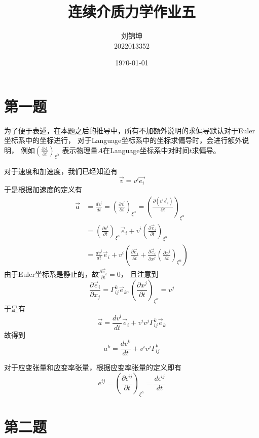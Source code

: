 \documentclass[UTF8]{ctexart}
\title{连续介质力学作业五}
\author{刘锦坤\\2022013352}
\date{\today}
\begin{document}
\maketitle

\section{第一题}

为了便于表述，在本题之后的推导中，所有不加额外说明的求偏导默认对于Euler坐标系中的坐标进行，
对于Language坐标系中的坐标求偏导时，会进行额外说明，
例如$(\frac{\partial A}{\partial t})_{\xi^\alpha}$
表示物理量$A$在Language坐标系中对时间$t$求偏导。

对于速度和加速度，我们已经知道有
$$
\vec v = v^i\vec{e_i}
$$
\noindent 于是根据加速度的定义有
\begin{align*}
\vec a &= \frac{d\vec v}{dt} = (\frac{\partial \vec v}{\partial t})_{\xi^\alpha}
=(\frac {\partial (v^i \vec e_i)}{\partial t})_{\xi^\alpha}\\
&=(\frac{\partial v^i}{\partial t})_{\xi^\alpha} \vec e_i+
v^i (\frac{\partial \vec e_i}{\partial t})_{\xi^\alpha}\\
&=\frac {dv^i}{dt} \vec e_i
+v^i(
    \frac{\partial \vec e_i}{\partial t}
    +\frac{\partial \vec e_i}{\partial x^j} (\frac{\partial x^j}{\partial t})_{\xi^\alpha}
    )
\end{align*}
\noindent 由于Euler坐标系是静止的，故$\frac{\partial \vec e_i}{\partial t}=0$，
且注意到
$$
\frac{\partial \vec e_i}{\partial x_j}=\Gamma_{ij}^k \vec e_k,
(\frac{\partial x^j}{\partial t})_{\xi^\alpha}=v^j
$$
\noindent 于是有
$$
\vec a = \frac {dv^i}{dt} \vec e_i + v^i v^j \Gamma_{ij}^k \vec e_k
$$
\noindent 故得到
\begin{equation}
a^k=\frac {dv^k}{dt} + v^i v^j \Gamma_{ij}^k
\tag{1}
\end{equation}

对于应变张量和应变率张量，根据应变率张量的定义即有
\begin{equation}
e^{ij}=(\frac{\partial \epsilon^{ij}}{\partial t})_{\xi^\alpha}=\frac{d\epsilon^{ij}}{dt}
\tag{2}
\end{equation}

\section{第二题}
\end{document}
